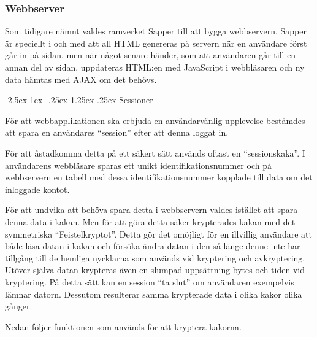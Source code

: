 \documentclass{article}
\makeatletter
\renewcommand*\paragraph{\@startsection{paragraph}{4}{\z@}%
			{-2.5ex\@plus -1ex \@minus -.25ex}%
			{1.25ex \@plus .25ex}%
			{\normalfont\normalsize\bfseries}}
\makeatother
\begin{document}
\subsubsection{Webbserver}
\label{webbserver}


Som tidigare nämnt valdes ramverket Sapper till att bygga webbservern. Sapper är
speciellt i och med att all HTML genereras på servern när en användare först går
in på sidan, men när något senare händer, som att användaren går till en annan
del av sidan, uppdateras HTML:en med JavaScript i webbläsaren och ny data hämtas
med AJAX om det behövs.

\paragraph{Sessioner}

För att webbapplikationen ska erbjuda en användarvänlig upplevelse bestämdes att
spara en användares ``session'' efter att denna loggat in.

För att åstadkomma detta på ett säkert sätt används oftast en ``sessionskaka''.
I användarens webbläsare sparas ett unikt identifikationsnummer och på
webbservern en tabell med dessa identifikationsnummer kopplade till data om det
inloggade kontot.


För att undvika att behöva spara detta i webbservern valdes istället att spara
denna data i kakan. Men för att göra detta säker krypterades kakan med det
symmetriska ``Feistelkryptot''. Detta gör det omöjligt för en illvillig
användare att både läsa datan i kakan och försöka ändra datan i den så länge
denne inte har tillgång till de hemliga nycklarna som används vid kryptering och
avkryptering. Utöver själva datan krypteras även en slumpad uppsättning bytes
och tiden vid kryptering. På detta sätt kan en session ``ta slut'' om användaren
exempelvis lämnar datorn. Dessutom resulterar samma krypterade data i olika
kakor olika gånger.

Nedan följer funktionen som används för att kryptera kakorna.
\end{document}
